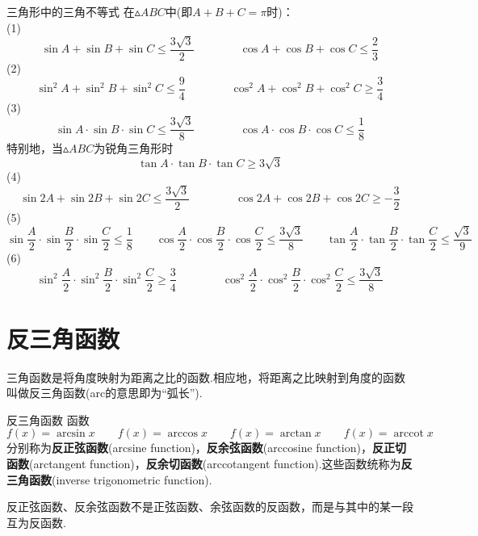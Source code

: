 \documentclass[lang=cn, zihao=5]{elegantbook}
\DeclareMathOperator{\arccot}{arccot}
\begin{document}
\begin{proposition}{三角形中的三角不等式} %
    在$\vartriangle ABC$中(即$A+B+C=\pi$时)：\\
    (1)$$\sin A + \sin B + \sin C \leq \frac{ 3\sqrt{3} }{2} \qquad \qquad \cos A + \cos B + \cos C \leq \frac{2}{3}$$
    (2)$$\sin ^2 A + \sin ^2 B + \sin ^2 C \leq \frac{9}{4} \qquad \qquad \cos ^2 A + \cos ^2 B + \cos ^2 C \geq \frac{3}{4}$$
    (3)$$\sin A \cdot \sin B \cdot \sin C \leq \frac{ 3\sqrt{3} }{8} \qquad \qquad \cos A \cdot \cos B \cdot \cos C \leq \frac{1}{8}$$
    特别地，当$\vartriangle ABC$为锐角三角形时
    $$\tan A \cdot \tan B \cdot \tan C \geq 3\sqrt{3}$$
    (4)
    $$\sin 2A + \sin 2B + \sin 2C \leq \frac{ 3\sqrt{3} }{2} \qquad \qquad \cos 2A + \cos 2B + \cos 2C \geq -\frac{3}{2}$$
    (5)
    $$\sin \frac{A}{2} \cdot \sin \frac{B}{2} \cdot \sin \frac{C}{2} \leq \frac{1}{8} \qquad \cos \frac{A}{2} \cdot \cos \frac{B}{2} \cdot \cos \frac{C}{2} \leq \frac{3 \sqrt{3}}{8} \qquad \tan \frac{A}{2} \cdot \tan \frac{B}{2} \cdot \tan \frac{C}{2} \leq \frac{\sqrt{3}}{9}$$
    (6)$$\sin ^2 \frac{A}{2} \cdot \sin ^2 \frac{B}{2} \cdot \sin ^2 \frac{C}{2} \geq \frac{3}{4} \qquad \qquad \cos ^2 \frac{A}{2} \cdot \cos ^2 \frac{B}{2} \cdot \cos ^2 \frac{C}{2} \leq \frac{3 \sqrt{3}}{8}$$
\end{proposition}

\section{反三角函数}

三角函数是将角度映射为距离之比的函数.相应地，将距离之比映射到角度的函数叫做反三角函数(arc的意思即为“弧长”).

\begin{definition}{反三角函数}
    函数$$f(x)=\arcsin{x} \qquad f(x)=\arccos{x} \qquad f(x)=\arctan{x} \qquad f(x)=\arccot{x}$$
    分别称为\textbf{反正弦函数}(arcsine function)，\textbf{反余弦函数}(arccosine function)，\textbf{反正切函数}(arctangent function)，\textbf{反余切函数}(arccotangent function).这些函数统称为\textbf{反三角函数}(inverse trigonometric function).
\end{definition}
\begin{note}
    反正弦函数、反余弦函数不是正弦函数、余弦函数的反函数，而是与其中的某一段互为反函数.
\end{note}
\end{document}
